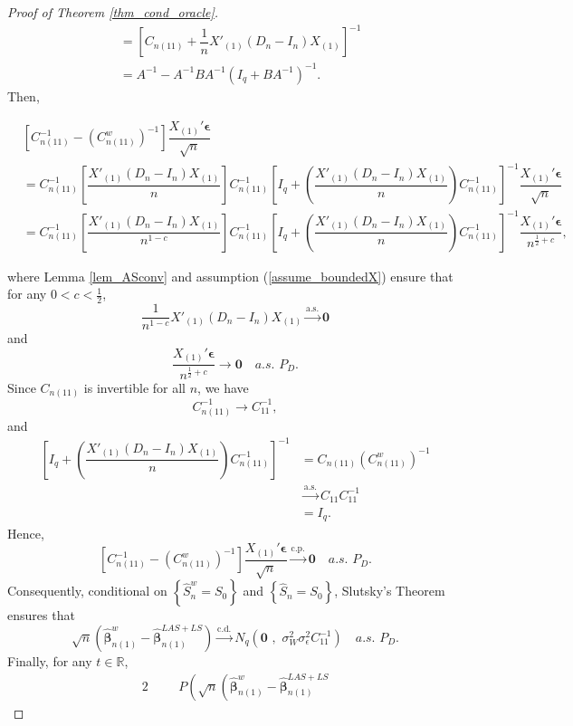 \documentclass[ejs,authoryear,linksfromyear]{imsart}
\newcommand{\CONV}[1]{\stackrel{\text{#1}}{\longrightarrow}} %
\newcommand{\bnwa}{\widehat{\bm{\beta}}_{n(1)}^w}
\newcommand{\cnwa}{C_{n(11)}^w}
\numberwithin{equation}{section}
\theoremstyle{plain}
\begin{document}
\begin{proof}[Proof of Theorem \ref{thm_cond_oracle}]
\begin{align*}
	&= \left[
		C_{n(11)} + \dfrac{1}{n} X'_{(1)} (D_n -  I_n) X_{(1)}
	\right]^{-1} \\
	&= A^{-1} - A^{-1} B A^{-1} 
	\left(
		I_q + B A^{-1}
	\right)^{-1}.
	\end{align*} 
	Then,
	\begin{small}
	\begin{align*}
	&\left[
	C_{n(11)}^{-1} - \left( \cnwa \right)^{-1}
	\right]  \dfrac{X_{(1)}' \bm{\epsilon}}{\sqrt{n}} \\
	&= C_{n(11)}^{-1} 
	\left[ \dfrac{X'_{(1)} (D_n - I_n) X_{(1)}}{n} \right]
	C_{n(11)}^{-1} 
	\left[
		I_q + 
		\left( \dfrac{X'_{(1)} (D_n - I_n) X_{(1)}}{n}  \right)
		C_{n(11)}^{-1} 
	\right]^{-1} \dfrac{X_{(1)}' \bm{\epsilon}}{\sqrt{n}} \\
	&= C_{n(11)}^{-1} 
	\left[ \dfrac{X'_{(1)} (D_n - I_n) X_{(1)}}{n^{1-c}} \right]
	C_{n(11)}^{-1} 
	\left[
		I_q + 
		\left( \dfrac{X'_{(1)} (D_n - I_n) X_{(1)}}{n}  \right)
		C_{n(11)}^{-1} 
	\right]^{-1} \dfrac{X_{(1)}' \bm{\epsilon}}{n^{\frac{1}{2}+c}},
	\end{align*}
	\end{small}
	where Lemma \ref{lem_ASconv} and assumption (\ref{assume_boundedX}) ensure that for any $0 < c < \frac{1}{2}$,
	$$
	\dfrac{1}{n^{1-c}} 
	X'_{(1)} (D_n - I_n) X_{(1)}
	\CONV{a.s.} \bm{0} 
	$$
	and
	$$
	\dfrac{X_{(1)}' \bm{\epsilon}}{n^{\frac{1}{2}+c}}
	\to \bm{0} \quad a.s. \,\, P_D.
	$$
	Since $C_{n(11)}$ is invertible for all $n$, we have
	$$
	C_{n(11)}^{-1} \to C_{11}^{-1},
	$$
	and 
	\begin{align*}
	\left[
		I_q + 
		\left( \dfrac{X'_{(1)} (D_n - I_n) X_{(1)}}{n}  \right)
		C_{n(11)}^{-1} 
	\right]^{-1} 
	&= C_{n(11)} \left(\cnwa \right)^{-1} \\
	&\CONV{a.s.} C_{11} C_{11}^{-1} \\
	&= I_q.
	\end{align*}
	Hence,
	$$
	\left[
	C_{n(11)}^{-1} - \left( \cnwa \right)^{-1}
	\right]  \dfrac{X_{(1)}' \bm{\epsilon}}{\sqrt{n}}
	\CONV{c.p.} \bm{0} \quad a.s. \,\, P_D.
	$$
	Consequently, conditional on $\left\{ \widehat{S}_n^w = S_0 \right\}$ and $\left\{ \widehat{S}_n = S_0 \right\}$, Slutsky's Theorem ensures that 
	$$
	\sqrt{n}
	\left(
	\bnwa - \widehat{\bm{\beta}}_{n(1)}^{LAS+LS}
	\right) 
	\CONV{c.d.}
	N_q \left( \bm{0} \,\, , \,\, \sigma^2_W \sigma^2_\epsilon C_{11}^{-1} \right)
	\quad a.s. \,\, P_D.
	$$
	Finally, for any $t \in \mathbb{R}$,
	\begin{alignat*}{2}
	& &&P \left(
		\sqrt{n} 
		\left(
			\bnwa - \widehat{\bm{\beta}}_{n(1)}^{LAS+LS}

\end{alignat*}
\end{proof}
\end{document}
